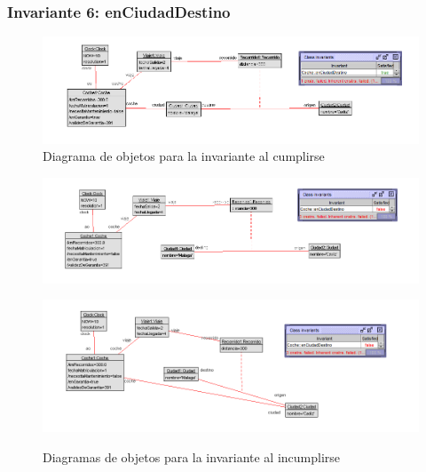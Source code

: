 \documentclass[12pt.a4paper]{article}
\begin{document}
\subsubsection{Invariante 6: enCiudadDestino}
    \begin{figure}[H]
         \centering
         \includegraphics[width=1\linewidth]{Soils/6.png}
         \caption{Diagrama de objetos para la invariante al cumplirse}
         \label{Diagrama_cumplimiento}
    \end{figure}

    
 \begin{figure}[H]
    \centering
    \begin{minipage}{0.49\textwidth}
        \centering
        \includegraphics[width=1\linewidth]{Soils/6_v2.png}
        \label{fig:diagrama1}
    \end{minipage}
    \hfill
    \begin{minipage}{0.49\textwidth}
        \centering
        \includegraphics[width=1\linewidth]{Soils/6_v3.png}
        \label{fig:diagrama2}
    \end{minipage}
    \caption{Diagramas de objetos para la invariante al incumplirse}
    \label{fig:diagrama_invariante}
\end{figure}
\end{document}
